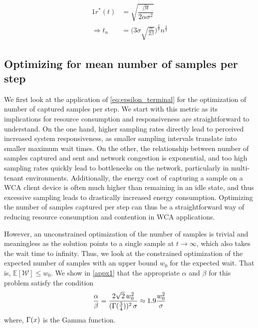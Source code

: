 \begin{alignat}{1}
r^*(t)&=\sqrt{\dfrac{\beta t}{2\alpha\sigma^2}}\nonumber\\
\Rightarrow t_n&=\Big(3\sigma\!\sqrt{\tfrac{\alpha}{2\beta}}\Big)^{\frac{2}{3}}n^{\frac{2}{3}}\label{tn_approx_rayleigh}
\end{alignat}


\subsection{Optimizing for mean number of samples per step}\label{ssec:optimization:samples}

We first look at the application of \cref{eq:epsilon_terminal} for the optimization of number of captured samples per step.
We start with this metric as its implications for resource consumption and responsiveness are straightforward to understand.
On the one hand, higher sampling rates directly lead to perceived increased system responsiveness, as smaller sampling intervals translate into smaller maximum wait times.
On the other, the relationship between number of samples captured and sent and network congestion is exponential, and too high sampling rates quickly lead to bottlenecks on the network, particularly in multi-tenant environments.
Additionally, the energy cost of capturing a sample on a \ac{WCA} client device is often much higher than remaining in an idle state, and thus excessive sampling leads to drastically increased energy consumption.
Optimizing the number of samples captured per step can thus be a straightforward way of reducing resource consumption and contention in \ac{WCA} applications.

However, an unconstrained optimization of the number of samples is trivial and meaningless as the solution points to a single sample at $t\!\rightarrow\!\infty$, which also takes the wait time to infinity.
Thus, we look at the constrained optimization of the expected number of samples with an upper bound $w_0$ for the expected wait.
That is, $\mathbb{E}[\mathcal{W}]\!\leq\!w_0$. We show in \cref{appx1} that the appropriate $\alpha$ and $\beta$ for this problem satisfy the condition
\begin{alignat}{1}\label{eq:optimization:sampling}
\frac{\alpha}{\beta}=\frac{2\sqrt{2}\,w_0^2}{(\mathlarger{\Gamma}(\tfrac{3}{4}))^2\,\sigma}\approx1.9\frac{w_0^2}{\sigma}
\end{alignat}
where, $\mathlarger{\Gamma}(x)$ is the Gamma function.

\medskip

